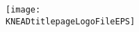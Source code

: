 {%

	\ifthenelse{\equal{\KNEADtitlepageLogoFileEPS}{}}{}
	{
		\vfill
		
		\begin{figure}[htbp]
			\centering
				\texttt{[image: \\KNEADtitlepageLogoFileEPS]}
		\end{figure}
	}%

	\vfill

	\begin{center}
		\KNEADtitlepageTitle
	\end{center}
	
	\vfill

	\ifthenelse{\equal{\KNEADtitlepageCompanyInfo}{}}{}
	{
		\ifthenelse{\equal{\KNEADtitlepageCompanyHeader}{}}{}
		{
			\begin{center}
				\singlespace
				\KNEADtitlepageCompanyHeader
			\end{center}
		}%
				
		\begin{center}
			\singlespace
			\KNEADtitlepageCompanyInfo
		\end{center}
			
		\vfill

	} %
	
	\ifthenelse{\equal{\KNEADcuiStatus}{}}
	{
		\ifthenelse{\equal{\KNEADtitlepageDistributionStatement}{}}{}
		{
			\linespread{0.75}\selectfont  
			{
				\begin{center}
					\bfseries \KNEADtitlepageDistributionStatement
				\end{center}
			}
		}
	}%


}%